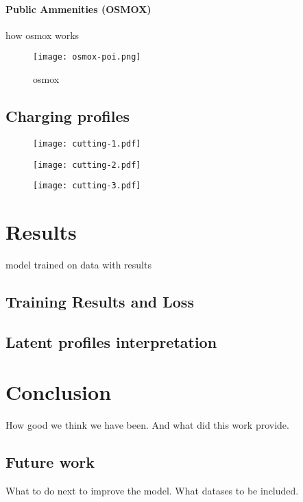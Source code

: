 \subsubsection{Public Ammenities (OSMOX)}

how osmox works
\begin{figure}[hb]
    \texttt{[image: osmox-poi.png]}
    \caption[osmox]{osmox}
    \label{fig:nn-latent}
\end{figure}


\section{Charging profiles}


\begin{figure}[hb]
    \texttt{[image: cutting-1.pdf]}
\end{figure}

\begin{figure}[hb]
    \texttt{[image: cutting-2.pdf]}
\end{figure}

\begin{figure}[hb]
    \texttt{[image: cutting-3.pdf]}
\end{figure}


\setchapterpreamble[u]{\margintoc}
\chapter{Results}

model trained on data with results
\section{Training Results and Loss}

\section{Latent profiles interpretation}


\chapter{Conclusion}

How good we think we have been. And what did this work provide.

\section{Future work}

What to do next to improve the model. What datases to be included.